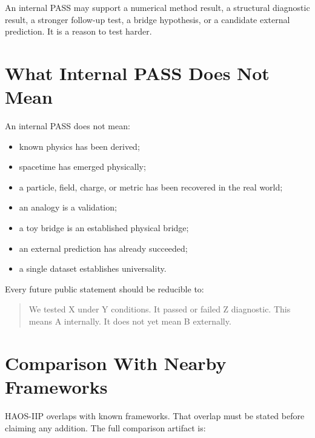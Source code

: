 \documentclass[11pt]{article}
\begin{document}
An internal PASS may support a numerical method result, a structural diagnostic result, a stronger follow-up test, a bridge hypothesis, or a candidate external prediction. It is a reason to test harder.

\section{What Internal PASS Does Not Mean}

An internal PASS does not mean:

\begin{itemize}
\item known physics has been derived;
\item spacetime has emerged physically;
\item a particle, field, charge, or metric has been recovered in the real world;
\item an analogy is a validation;
\item a toy bridge is an established physical bridge;
\item an external prediction has already succeeded;
\item a single dataset establishes universality.
\end{itemize}

Every future public statement should be reducible to:

\begin{quote}
We tested X under Y conditions. It passed or failed Z diagnostic. This means A internally. It does not yet mean B externally.
\end{quote}

\section{Comparison With Nearby Frameworks}

HAOS-IIP overlaps with known frameworks. That overlap must be stated before claiming any addition. The full comparison artifact is:

\begin{quote}
\end{quote}
\end{document}
